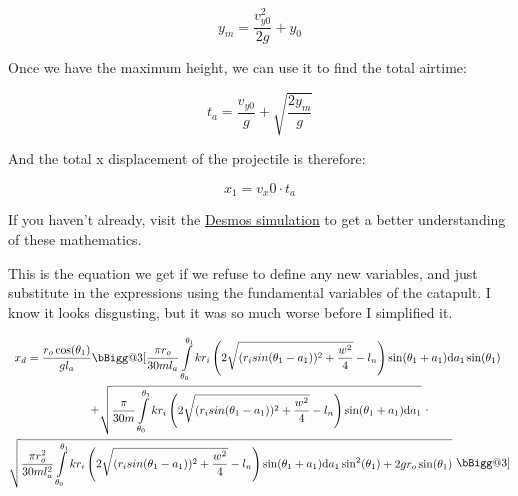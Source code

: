 \documentclass[10pt]{article}
\makeatletter
\newcommand{\vast}{\bBigg@{3}}
\makeatother
\begin{document}
\begin{flushleft}
    $$ y_m = \frac{v_{y0}^2}{2g} + y_0 $$

    Once we have the maximum height, we can use it to find the total airtime:

    $$ t_a = \frac{v_{y0}}{g} + \sqrt{\frac{2y_m}{g}} $$

    And the total x displacement of the projectile is therefore:

    $$ x_1 = v_x0 \cdot t_a $$

    If you haven't already, visit the \href{https://www.desmos.com/calculator/xfx41esvkw}{\underline{Desmos simulation}} to get a better understanding of these mathematics.

    This is the equation we get if we refuse to define any new variables, and just substitute in the expressions using the fundamental variables of the catapult.
    I know it looks disgusting, but it was so much worse before I simplified it.

\end{flushleft}


  \begin{equation*}
    \begin{gathered}
      x_d = 
      \frac { r_o \cos(\theta_1) } {gl_a} 
      \vast[
        \frac{\pi r_o}{30ml_a} 
        \int\limits_{\theta_0}^{\theta_1} 
          kr_i \left( 2
            \sqrt{
              (r_i sin (\theta_1 - a_1))^2
              + \frac{w^2}{4}
            } - l_n 
          \right)
          \sin(\theta_1 + a_1) 
        \mathrm{d}a_1
        \sin(\theta_1) \
      \\
      + \begin{gathered} 
        \sqrt{ 
          \frac{\pi}{30m} 
          \int\limits_{\theta_0}^{\theta_1}
            kr_i \left( 2 
              \sqrt{
                (r_i sin (\theta_1 - a_1))^2
                + \frac{w^2}{4}
              } - l_n
            \right) 
            \sin(\theta_1 + a_1) 
          \mathrm{d}a_1 } 
      \end{gathered}
      \ \cdot
      \\
      \begin{gathered}
        \sqrt{
          \begin{gathered} 
              \frac{\pi r_o^2}{30ml_a^2} 
              \int\limits_{\theta_0}^{\theta_1}
                kr_i \left( 2 
                \sqrt{
                  (r_i sin (\theta_1 - a_1))^2
                  + \frac{w^2}{4}
                } - l_n
                \right) \sin(\theta_1 + a_1) \mathrm{d}a_1  \sin^2(\theta_1) 
          \end{gathered} 
        + 2gr_o \sin(\theta_1) } \ 
      \end{gathered} \vast]
    \end{gathered}
    \strut
  \end{equation*}
\end{document}

